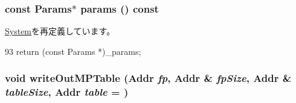 \hypertarget{classX86System_acd3c3feb78ae7a8f88fe0f110a718dff}{
\subsubsection[{params}]{\setlength{\rightskip}{0pt plus 5cm}const {\bf Params}$\ast$ params () const}}
\label{classX86System_acd3c3feb78ae7a8f88fe0f110a718dff}


\hyperlink{classSystem_acd3c3feb78ae7a8f88fe0f110a718dff}{System}を再定義しています。


\begin{DoxyCode}
93 { return (const Params *)_params; }
\end{DoxyCode}
\hypertarget{classX86System_ac86acd47948194bfedd9cf4f63400d2a}{
\subsubsection[{writeOutMPTable}]{\setlength{\rightskip}{0pt plus 5cm}void writeOutMPTable ({\bf Addr} {\em fp}, \/  {\bf Addr} \& {\em fpSize}, \/  {\bf Addr} \& {\em tableSize}, \/  {\bf Addr} {\em table} = {})}}
\label{classX86System_ac86acd47948194bfedd9cf4f63400d2a}



